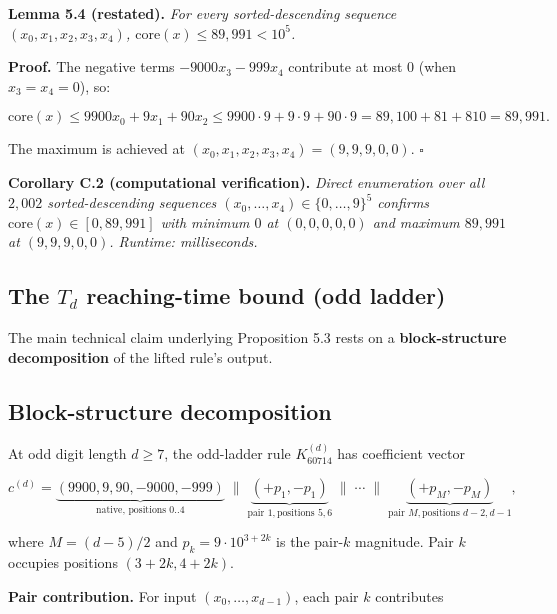 \documentclass[11pt,letterpaper]{article}
\theoremstyle{paperstyle}
\theoremstyle{paperstyledef}
\theoremstyle{paperstylerem}
\begin{document}
\textbf{Lemma 5.4 (restated).} \emph{For every sorted-descending
sequence \((x_0, x_1, x_2, x_3, x_4)\),
\(\mathrm{core}(x) \leq 89{,}991 < 10^5\).}

\textbf{Proof.} The negative terms \(-9000 x_3 - 999 x_4\) contribute at
most \(0\) (when \(x_3 = x_4 = 0\)), so:

\[\mathrm{core}(x) \leq 9900 x_0 + 9 x_1 + 90 x_2 \leq 9900 \cdot 9 + 9 \cdot 9 + 90 \cdot 9 = 89{,}100 + 81 + 810 = 89{,}991.\]

The maximum is achieved at
\((x_0, x_1, x_2, x_3, x_4) = (9, 9, 9, 0, 0)\). \(\square\)

\textbf{Corollary C.2 (computational verification).} \emph{Direct
enumeration over all \(2{,}002\) sorted-descending sequences
\((x_0, \ldots, x_4) \in \{0, \ldots, 9\}^5\) confirms
\(\mathrm{core}(x) \in [0, 89{,}991]\) with minimum \(0\) at
\((0, 0, 0, 0, 0)\) and maximum \(89{,}991\) at \((9, 9, 9, 0, 0)\).
Runtime: milliseconds.}

\hypertarget{c.4-the-t_d-reaching-time-bound-odd-ladder}{%
\subsection{\texorpdfstring{The \(T_d\) reaching-time bound (odd ladder)}{The T\_d reaching-time bound (odd ladder)}}\label{c.4-the-t_d-reaching-time-bound-odd-ladder}}

The main technical claim underlying Proposition 5.3 rests on a
\textbf{block-structure decomposition} of the lifted rule's output.

\hypertarget{c.4.1-block-structure-decomposition}{%
\subsection{Block-structure decomposition}\label{c.4.1-block-structure-decomposition}}

At odd digit length \(d \geq 7\), the odd-ladder rule
\(K^{(d)}_{60714}\) has coefficient vector

\[c^{(d)} = \underbrace{(9900, 9, 90, -9000, -999)}_{\text{native, positions } 0..4} \; \| \; \underbrace{(+p_1, -p_1)}_{\text{pair }1, \text{positions } 5, 6} \; \| \; \cdots \; \| \; \underbrace{(+p_M, -p_M)}_{\text{pair }M, \text{positions } d-2, d-1},\]

where \(M = (d-5)/2\) and \(p_k = 9 \cdot 10^{3 + 2k}\) is the
pair-\(k\) magnitude. Pair \(k\) occupies positions
\((3 + 2k, 4 + 2k)\).

\textbf{Pair contribution.} For input \((x_0, \ldots, x_{d-1})\), each
pair \(k\) contributes
\end{document}
